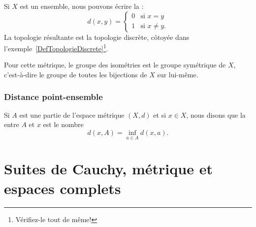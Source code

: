 \begin{example}
	Si \( X\) est un ensemble, nous pouvons écrire la  :
	\begin{equation}
		d(x,y)=\begin{cases}
			0 & \text{si } x=y             \\
			1 & \text{si } x\neq y\text{.}
		\end{cases}
	\end{equation}
	La topologie résultante est la topologie discrète, côtoyée dans l'exemple~\ref{DefTopologieDiscrete}\footnote{Vérifiez-le tout de même!}.

	Pour cette métrique, le groupe des isométries est le groupe symétrique de \( X\), c'est-à-dire le groupe de toutes les bijections de \( X\) sur lui-même.
\end{example}

\subsubsection{Distance point-ensemble}

\begin{definition}
	Si \( A\) est une partie de l'espace métrique \( (X,d)\) et si \( x\in X\), nous disons que la  entre \( A\) et \( x\) est le nombre
	\begin{equation}		\label{EqdefDistaA}
		d(x,A)=\inf_{a\in A}d(x,a).
	\end{equation}
\end{definition}
\newcommand{\CaptionFigDistanceEnsemble}{La distance entre \( x\) et \( A\) est donnée par la distance entre \( x\) et \( p\). Les distances entre \( x\) et les autres points de \( A\) sont plus grandes que \( d(x,p)\).}






\section{Suites de Cauchy, métrique et espaces complets}

